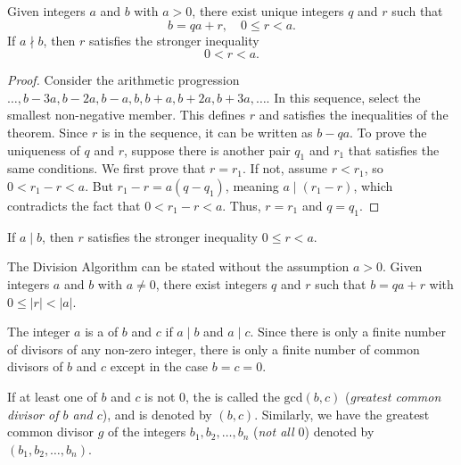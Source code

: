 \documentclass[11pt]{article}
\begin{document}
\begin{theorem}\label{1.2}
    Given integers \(a\) and \(b\) with \(a > 0\), there exist unique integers \(q\) and \(r\) such that
    \[
        b = qa + r, \quad 0 \leq r < a.
    \]
    If \(a \nmid b\), then \(r\) satisfies the stronger inequality
    \[
        0 < r < a.
    \]
\end{theorem}

\begin{proof}
    Consider the arithmetic progression $\ldots, b - 3a, b - 2a, b - a, b, b + a, b + 2a, b + 3a, \ldots$. In this sequence, select the smallest non-negative member. This defines $r$ and satisfies the inequalities of the theorem. Since $r$ is in the sequence, it can be written as $b - qa$. To prove the uniqueness of $q$ and $r$, suppose there is another pair $q_1$ and $r_1$ that satisfies the same conditions. We first prove that $r = r_1$. If not, assume $r < r_1$, so $0 < r_1 - r < a$. But $r_1 - r = a(q - q_1)$, meaning $a \mid (r_1 - r)$, which contradicts the fact that $0 < r_1 - r < a$. Thus, $r = r_1$ and $q = q_1$.
\end{proof}

\begin{fact}
    If $a \mid b$, then $r$ satisfies the stronger inequality $0 \leq r < a$.
\end{fact}

\begin{fact}
    The Division Algorithm can be stated without the assumption $a > 0$. Given integers $a$ and $b$ with $a \neq 0$, there exist integers $q$ and $r$ such that $b = qa + r$ with $0 \leq |r| < |a|$.
\end{fact}

\begin{definition}
    The integer $a$ is a  of $b$ and $c$ if $a \mid b$ and $a \mid c$. Since there is only a finite number of divisors of any non-zero integer, there is only a finite number of common divisors of $b$ and $c$ except in the case $b = c = 0$.
\end{definition}

If at least one of \( b \) and \( c \) is not \( 0 \), the  is called the  \( \text{gcd}(b, c) \)
(\textit{greatest common divisor of \( b \) and \( c \)}), and is denoted by \(
(b, c) \). Similarly, we have the greatest common divisor \( g \) of the
integers \( b_1, b_2, \ldots, b_n \) (\textit{not all \( 0 \)}) denoted by \(
(b_1, b_2, \ldots, b_n) \).
\end{document}
